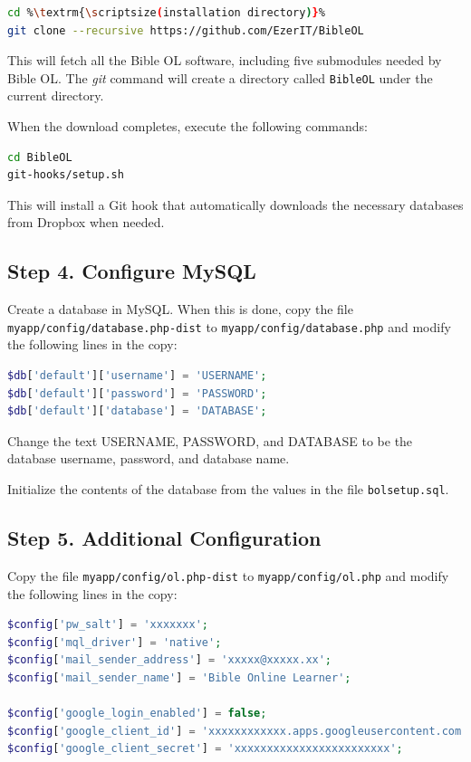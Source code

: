 \documentclass[11pt,oneside,a4paper]{memoir}
\begin{document}
\begin{lstlisting}[language=bash]
cd %\textrm{\scriptsize(installation directory)}%
git clone --recursive https://github.com/EzerIT/BibleOL
\end{lstlisting}

This will fetch all the Bible OL software, including five submodules needed by Bible OL. The
\emph{git} command will create a directory called \texttt{BibleOL} under the current directory.

When the download completes, execute the following commands:

\begin{lstlisting}[language=bash]
cd BibleOL
git-hooks/setup.sh
\end{lstlisting}

This will install a Git hook that automatically downloads the necessary databases from Dropbox when
needed.


\subsection{Step 4. Configure MySQL}

Create a database in MySQL. When this is done, copy the file \texttt{myapp/config/database.php-dist}
to \texttt{myapp/config/database.php} and modify the following lines in the copy:

\begin{lstlisting}[language=PHP]
$db['default']['username'] = 'USERNAME';
$db['default']['password'] = 'PASSWORD';
$db['default']['database'] = 'DATABASE';
\end{lstlisting}

Change the text USERNAME, PASSWORD, and DATABASE to be the database username, password, and database
name.

Initialize the contents of the database from the values in the file \texttt{bolsetup.sql}.


\subsection{Step 5. Additional Configuration}

Copy the file \texttt{myapp/config/ol.php-dist} to \texttt{myapp/config/ol.php} and modify the
following lines in the copy:

\begin{lstlisting}[language=PHP]
$config['pw_salt'] = 'xxxxxxx';
$config['mql_driver'] = 'native';
$config['mail_sender_address'] = 'xxxxx@xxxxx.xx';
$config['mail_sender_name'] = 'Bible Online Learner';

$config['google_login_enabled'] = false;
$config['google_client_id'] = 'xxxxxxxxxxxx.apps.googleusercontent.com';
$config['google_client_secret'] = 'xxxxxxxxxxxxxxxxxxxxxxxx';
\end{lstlisting}
\end{document}
